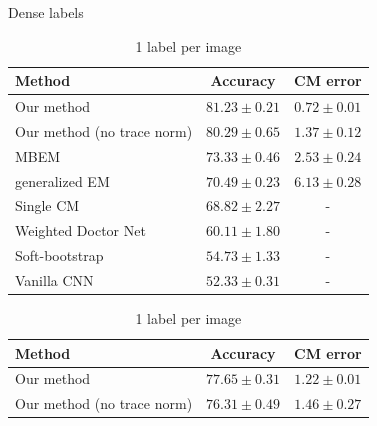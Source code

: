 \begin{table}[h]
	\scriptsize
    \begin{subtable}[t]{0.45\linewidth}
	     \caption{Dense labels}
        \begin{tabular}{lcc}
            \hline
                \toprule
                Method    & Accuracy  & CM error \\
                \midrule
                Our method                                  & $\bm{81.23 \pm 0.21}$ & $\bm{0.72 \pm  0.01}$ \\
                Our method (no trace norm)                  & $80.29 \pm 0.65$ & $1.37 \pm  0.12$ \\
        
                MBEM \cite{khetan2017learning}              & $73.33 \pm 0.46$ & $2.53 \pm 0.24$  \\
                generalized EM \cite{raykar2009supervised}  & $70.49 \pm 0.23$ & $6.13 \pm 0.28$  \\
                \midrule
                Single CM \cite{sukhbaatar2014training}  & $68.82 \pm 2.27$  & -   \\
                Weighted Doctor Net \cite{guan2017said}     & $60.11 \pm 1.80$   &  -  \\
                Soft-bootstrap \cite{reed2014training}      & $54.73 \pm 1.33$ & -    \\
                Vanilla CNN \cite{reed2014training}         & $52.33 \pm 0.31$ & -    \\
        \hline
        \end{tabular}
    \end{subtable}
	\hfil
    \begin{subtable}[t]{0.45\linewidth}
    \caption{1 label per image}
        \begin{tabular}{lcc}
        \hline
            \toprule
            Method    & Accuracy  & CM error \\
            \midrule
            Our method                                  & $\bm{77.65\pm0.31}$ & $\bm{1.22\pm0.01}$\\
            Our method (no trace norm)                  & $76.31\pm0.49$ & $1.46 \pm 0.27$ \\
    

\end{tabular}
\end{subtable}
\end{table}

